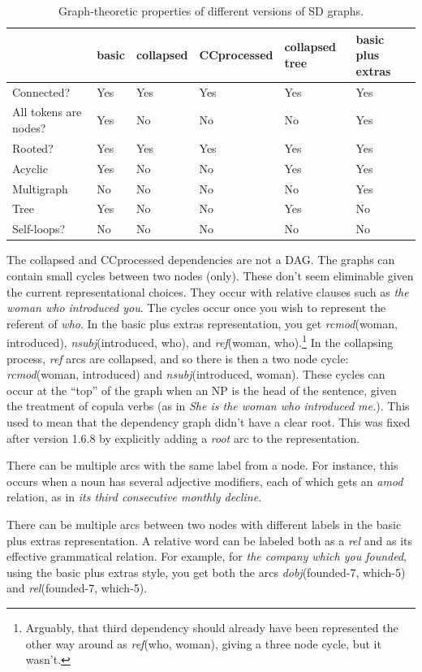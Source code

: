\documentclass[11pt,letter]{article}
\begin{document}
\begin{table}
\begin{tabular}{llllll}
\hline
 & basic & collapsed & CCprocessed & collapsed tree & basic plus extras\\ \hline
Connected? & Yes & Yes & Yes & Yes & Yes \\
All tokens are nodes? & Yes & No & No & No & Yes \\
Rooted? & Yes & Yes & Yes & Yes & Yes \\
Acyclic & Yes & No & No & Yes & Yes \\
Multigraph & No & No & No & No & Yes \\
Tree & Yes & No & No & Yes & No \\
Self-loops? & No & No & No & No & No \\ \hline
\end{tabular}
\caption{Graph-theoretic properties of different versions of SD graphs.}\label{graph-properties}
\end{table}

The collapsed and CCprocessed dependencies are not a DAG\@.
The graphs can contain small cycles between two nodes (only).
These don't seem eliminable given the current
representational choices.  They occur with relative clauses such as
\emph{the woman who introduced you}.  The cycles occur once you wish to represent the
referent of \emph{who}. In the basic plus extras
representation, you get \emph{rcmod}(woman, introduced), \emph{nsubj}(introduced, who),
and \emph{ref}(woman, who).\footnote
  {Arguably, that third dependency should already have been represented the
   other way around as \emph{ref}(who, woman), giving a three node cycle, but
   it wasn't.}
In the collapsing process, \emph{ref} arcs are collapsed, and so there is then
a two node cycle: \emph{rcmod}(woman, introduced) and \emph{nsubj}(introduced, woman).
These cycles can occur at the ``top'' of the graph when an NP is the head of the
sentence, given the treatment of copula verbs (as in \emph{She is the woman who introduced me.}). This used to
mean that the dependency graph didn't have a clear root. This was fixed after
version 1.6.8 by explicitly adding a \emph{root} arc to the representation.

There can be multiple arcs with the same label from a node.  For instance, this
occurs when a noun has several adjective modifiers, each of which gets an
\emph{amod} relation, as in \emph{its third consecutive monthly decline}.

There can be multiple arcs between two nodes with different labels in the basic
plus extras representation.  A relative word can be labeled both as a \emph{rel}
and as its effective grammatical relation.  For example, for \emph{the company
which you founded}, using the basic plus extras style, you get both the arcs
\emph{dobj}(founded-7, which-5) and
\emph{rel}(founded-7, which-5).
\end{document}
